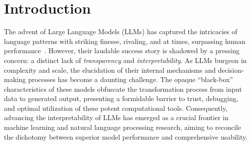 \documentclass[letterpaper]{article} %
\begin{document}
\section{Introduction}

The advent of Large Language Models (LLMs) has captured the intricacies of language patterns with striking finesse, rivaling, and at times, surpassing human performance~\citep{zhou2022large,openai2023gpt4}. However, their laudable success story is shadowed by a pressing concern: a distinct lack of \textit{transparency} and \textit{interpretability}. As LLMs burgeon in complexity and scale, the elucidation of their internal mechanisms and decision-making processes has become a daunting challenge. The opaque ``black-box'' characteristics of these models obfuscate the transformation process from input data to generated output, presenting a formidable barrier to trust, debugging, and optimal utilization of these potent computational tools. Consequently, advancing the interpretability of LLMs has emerged as a crucial frontier in machine learning and natural language processing research, aiming to reconcile the dichotomy between superior model performance and comprehensive usability. 
\end{document}
